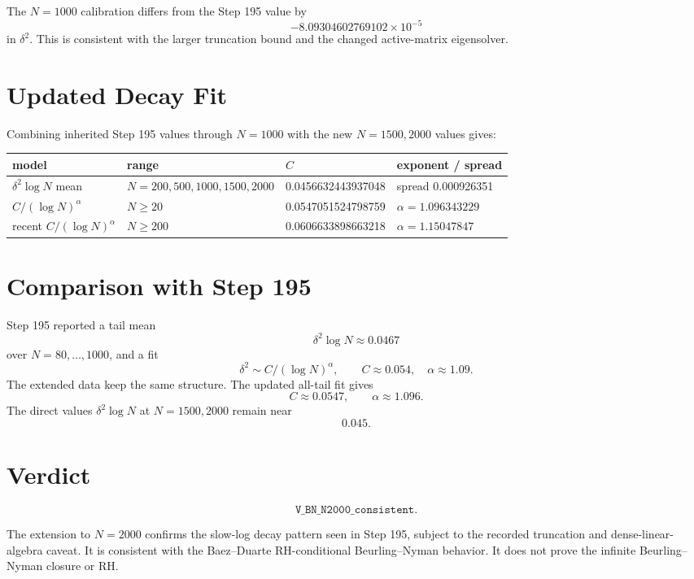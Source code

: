 \documentclass[11pt]{article}
\begin{document}
The \(N=1000\) calibration differs from the Step 195 value by
\[
  -8.09304602769102\times 10^{-5}
\]
in \(\delta^2\).  This is consistent with the larger truncation bound and the
changed active-matrix eigensolver.

\section*{Updated Decay Fit}

Combining inherited Step 195 values through \(N=1000\) with the new
\(N=1500,2000\) values gives:

\begin{center}
\begin{tabular}{llll}
\toprule
model & range & \(C\) & exponent / spread\\
\midrule
\(\delta^2\log N\) mean & \(N=200,500,1000,1500,2000\) & 0.0456632443937048 & spread 0.000926351\\
\(C/(\log N)^\alpha\) & \(N\ge20\) & 0.0547051524798759 & \(\alpha=1.096343229\)\\
recent \(C/(\log N)^\alpha\) & \(N\ge200\) & 0.0606633898663218 & \(\alpha=1.15047847\)\\
\bottomrule
\end{tabular}
\end{center}

\section*{Comparison with Step 195}

Step 195 reported a tail mean
\[
  \delta^2\log N\approx0.0467
\]
over \(N=80,\ldots,1000\), and a fit
\[
  \delta^2\sim C/(\log N)^\alpha,\qquad
  C\approx0.054,\quad \alpha\approx1.09.
\]
The extended data keep the same structure.  The updated all-tail fit gives
\[
  C\approx0.0547,\qquad \alpha\approx1.096.
\]
The direct values \(\delta^2\log N\) at \(N=1500,2000\) remain near
\[
  0.045.
\]

\section*{Verdict}

\[
\boxed{\texttt{V\_BN\_N2000\_consistent}.}
\]

The extension to \(N=2000\) confirms the slow-log decay pattern seen in Step
195, subject to the recorded truncation and dense-linear-algebra caveat.  It
is consistent with the Baez--Duarte RH-conditional Beurling--Nyman behavior.
It does not prove the infinite Beurling--Nyman closure or RH.
\end{document}
